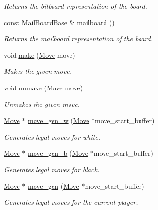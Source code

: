 \begin{DoxyCompactItemize}
\begin{DoxyCompactList}\small\item\em Returns the bitboard representation of the board. \end{DoxyCompactList}\item 
const \hyperlink{structMailBoardBase}{Mail\+Board\+Base} \& \hyperlink{classBitBoard_a5397163febc786ddb7d9a324f37136da}{mailboard} ()
\begin{DoxyCompactList}\small\item\em Returns the mailboard representation of the board. \end{DoxyCompactList}\item 
void \hyperlink{classBitBoard_ad6a94224aa19bc86bbb14969d09a55e6}{make} (\hyperlink{structMove}{Move} move)
\begin{DoxyCompactList}\small\item\em Makes the given move. \end{DoxyCompactList}\item 
void \hyperlink{classBitBoard_ab81352f4aa143825a4763eba1947088c}{unmake} (\hyperlink{structMove}{Move} move)
\begin{DoxyCompactList}\small\item\em Unmakes the given move. \end{DoxyCompactList}\item 
\hyperlink{structMove}{Move} $\ast$ \hyperlink{classBitBoard_a1367722f40d889d95acdb6224cc34205}{move\+\_\+gen\+\_\+w} (\hyperlink{structMove}{Move} $\ast$move\+\_\+start\+\_\+buffer)
\begin{DoxyCompactList}\small\item\em Generates legal moves for white. \end{DoxyCompactList}\item 
\hyperlink{structMove}{Move} $\ast$ \hyperlink{classBitBoard_ae16917d3f752d11e5f689228d87bcf29}{move\+\_\+gen\+\_\+b} (\hyperlink{structMove}{Move} $\ast$move\+\_\+start\+\_\+buffer)
\begin{DoxyCompactList}\small\item\em Generates legal moves for black. \end{DoxyCompactList}\item 
\hyperlink{structMove}{Move} $\ast$ \hyperlink{classBitBoard_a5ce954a262cf51bee94d1508b9002464}{move\+\_\+gen} (\hyperlink{structMove}{Move} $\ast$move\+\_\+start\+\_\+buffer)
\begin{DoxyCompactList}\small\item\em Generates legal moves for the current player. \end{DoxyCompactList}\item 

\end{DoxyCompactItemize}
